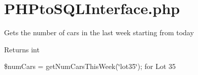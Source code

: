 \hypertarget{_p_h_pto_s_q_l_interface_8php-example}{}\section{P\+H\+Pto\+S\+Q\+L\+Interface.\+php}
Gets the number of cars in the last week starting from today \begin{DoxyReturn}{Returns}
int
\end{DoxyReturn}
\$num\+Cars = get\+Num\+Cars\+This\+Week(\char`\"{}lot35\char`\"{}); for Lot 35


\begin{DoxyCodeInclude}
\end{DoxyCodeInclude}
 